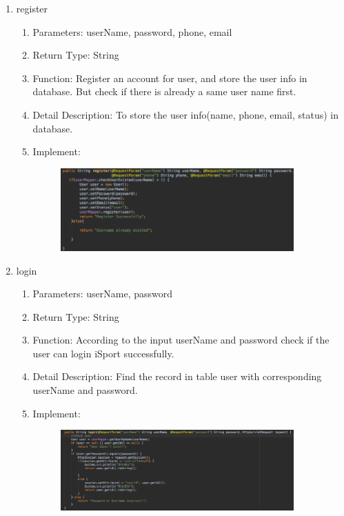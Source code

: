 \documentclass[16pt]{scrreprt}
\begin{document}
\begin{enumerate}
\begin{enumerate}
\begin{figure}[H]
\end{figure}
	\end{enumerate}
	\item register
	\begin{enumerate}
		\item Parameters: userName, password, phone, email
		\item Return Type: String
		\item Function: Register an account for user, and store the user info in database. But check if there is already a same user name first.
		\item Detail Description: To store the user info(name, phone, email, status) in database.
		\item Implement:
		\begin{figure}[H]
	\centering
	\includegraphics[width=0.9\textwidth]{diagrams/registerfunc.png}\\
\end{figure}
\end{enumerate}
	\item login
	\begin{enumerate}
		\item Parameters: userName, password
		\item Return Type: String
		\item Function: According to the input userName and password check if the user can login iSport successfully.
		\item Detail Description: Find the record in table user with corresponding userName and password.
		\item Implement:
		\begin{figure}[H]
	\centering
	\includegraphics[width=0.9\textwidth]{diagrams/loginfunc.png}\\

\end{figure}
\end{enumerate}
\end{enumerate}
\end{document}
